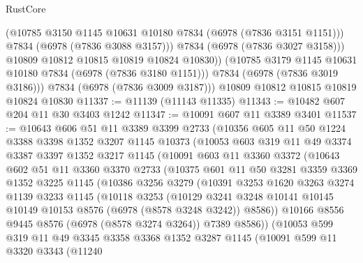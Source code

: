 \begin{lexlean}{RustCore}
\begin{coremodule}
                (@10785 @3150 @1145 @10631 @10180 @7834 (@6978 (@7836 @3151 @1151)))
                @7834
                (@6978 (@7836 @3088 @3157)))
              @7834
              (@6978 (@7836 @3027 @3158)))
            @10809
            @10812
            @10815
            @10819
            @10824
            @10830))
        (@10785 @3179 @1145 @10631 @10180 @7834 (@6978 (@7836 @3180 @1151)))
        @7834
        (@6978 (@7836 @3019 @3186)))
      @7834
      (@6978 (@7836 @3009 @3187)))
    @10809
    @10812
    @10815
    @10819
    @10824
    @10830
@11337 := @11139 (@11143 @11335)
@11343 := @10482 @607 @204 @11 @30 @3403 @1242
@11347 := @10091 @607 @11 @3389 @3401
@11537 := @10643
    @606
    @51
    @11
    @3389
    @3399
    @2733
    (@10356
      @605
      @11
      @50
      @1224
      @3388
      @3398
      @1352
      @3207
      @1145
      @10373
      (@10053
        @603
        @319
        @11
        @49
        @3374
        @3387
        @3397
        @1352
        @3217
        @1145
        (@10091
          @603
          @11
          @3360
          @3372
          (@10643
            @602
            @51
            @11
            @3360
            @3370
            @2733
            (@10375
              @601
              @11
              @50
              @3281
              @3359
              @3369
              @1352
              @3225
              @1145
              (@10386
                @3256
                @3279
                (@10391
                  @3253
                  @1620
                  @3263
                  @3274
                  @1139
                  @3233
                  @1145
                  (@10118
                    @3253
                    (@10129
                      @3241
                      @3248
                      @10141
                      @10145
                      @10149
                      @10153
                      @8576
                      (@6978 (@8578 @3248 @3242))
                      @8586))
                  @10166
                  @8556
                  @9445
                  @8576
                  (@6978 (@8578 @3274 @3264))
                  @7389
                  @8586))
              (@10053
                @599
                @319
                @11
                @49
                @3345
                @3358
                @3368
                @1352
                @3287
                @1145
                (@10091
                  @599
                  @11
                  @3320
                  @3343
                  (@11240

\end{coremodule}
\end{lexlean}
